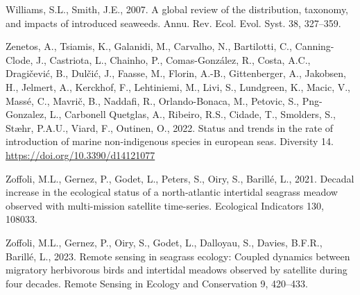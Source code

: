 \documentclass[
  letterpaper,
  DIV=11,
  numbers=noendperiod]{scrartcl}
\newlength{\cslhangindent}
\newenvironment{CSLReferences}[2] %
 {\begin{list}{}{%
  \setlength{\itemindent}{0pt}
  \setlength{\leftmargin}{0pt}
  \setlength{\parsep}{0pt}
  \ifodd #1
   \setlength{\leftmargin}{\cslhangindent}
   \setlength{\itemindent}{-1\cslhangindent}
  \fi
  \setlength{\itemsep}{#2\baselineskip}}}
 {\end{list}}
\begin{document}
\begin{CSLReferences}{1}{0}
Williams, S.L., Smith, J.E., 2007. A global review of the distribution,
taxonomy, and impacts of introduced seaweeds. Annu. Rev. Ecol. Evol.
Syst. 38, 327--359.

Zenetos, A., Tsiamis, K., Galanidi, M., Carvalho, N., Bartilotti, C.,
Canning-Clode, J., Castriota, L., Chainho, P., Comas-González, R.,
Costa, A.C., Dragičević, B., Dulčić, J., Faasse, M., Florin, A.-B.,
Gittenberger, A., Jakobsen, H., Jelmert, A., Kerckhof, F., Lehtiniemi,
M., Livi, S., Lundgreen, K., Macic, V., Massé, C., Mavrič, B., Naddafi,
R., Orlando-Bonaca, M., Petovic, S., Png-Gonzalez, L., Carbonell
Quetglas, A., Ribeiro, R.S., Cidade, T., Smolders, S., Stæhr, P.A.U.,
Viard, F., Outinen, O., 2022. Status and trends in the rate of
introduction of marine non-indigenous species in european seas.
Diversity 14. \url{https://doi.org/10.3390/d14121077}

Zoffoli, M.L., Gernez, P., Godet, L., Peters, S., Oiry, S., Barillé, L.,
2021. Decadal increase in the ecological status of a north-atlantic
intertidal seagrass meadow observed with multi-mission satellite
time-series. Ecological Indicators 130, 108033.

Zoffoli, M.L., Gernez, P., Oiry, S., Godet, L., Dalloyau, S., Davies,
B.F.R., Barillé, L., 2023. Remote sensing in seagrass ecology: Coupled
dynamics between migratory herbivorous birds and intertidal meadows
observed by satellite during four decades. Remote Sensing in Ecology and
Conservation 9, 420--433.

\end{CSLReferences}
\end{document}

